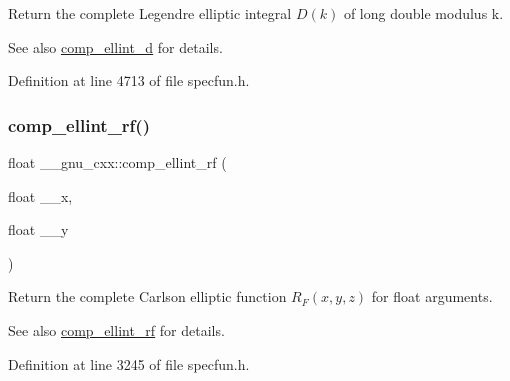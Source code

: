 Return the complete Legendre elliptic integral $ D(k) $ of {\ttfamily long double} modulus {\ttfamily k}.

\begin{DoxySeeAlso}{See also}
\hyperlink{group__mathsf__gnu_ga3fe79a91524b43ffc5ffb83c0eb2bd00}{comp\+\_\+ellint\+\_\+d} for details. 
\end{DoxySeeAlso}


Definition at line 4713 of file specfun.\+h.

\mbox{\label{group__mathsf__gnu_ga55ae30b4f8ff15017d18a80050e14e38}} 
\subsubsection{\texorpdfstring{comp\+\_\+ellint\+\_\+rf()}{comp\_ellint\_rf()}\hspace{0.1cm}{\footnotesize\ttfamily [1/3]}}
{\footnotesize\ttfamily float \+\_\+\+\_\+gnu\+\_\+cxx\+::comp\+\_\+ellint\+\_\+rf (\begin{DoxyParamCaption}\item[{float}]{\+\_\+\+\_\+x,  }\item[{float}]{\+\_\+\+\_\+y }\end{DoxyParamCaption})\hspace{0.3cm}{\ttfamily [inline]}}

Return the complete Carlson elliptic function $ R_F(x,y,z) $ for {\ttfamily float} arguments.

\begin{DoxySeeAlso}{See also}
\hyperlink{group__mathsf__gnu_ga55ae30b4f8ff15017d18a80050e14e38}{comp\+\_\+ellint\+\_\+rf} for details. 
\end{DoxySeeAlso}


Definition at line 3245 of file specfun.\+h.

\mbox{\label{group__mathsf__gnu_gae1d468487f1711e91719a9c6392f3c35}} 
